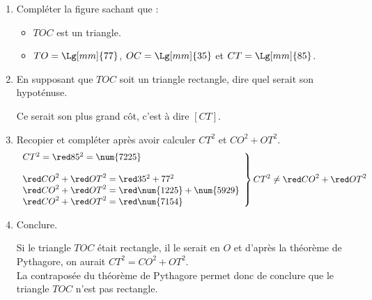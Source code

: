 \begin{corrige}
    \begin{enumerate}
        \item Compléter la figure sachant que :
        \begin{itemize}
            \item $TOC$ est un triangle.
            \item $TO=\Lg[mm]{77}$, $OC=\Lg[mm]{35}$ et $CT=\Lg[mm]{85}$.
        \end{itemize}

        \medskip
        \item En supposant que $TOC$ soit un triangle rectangle, dire quel serait son hypoténuse.
        
        {\red Ce serait son plus grand côt, c'est à dire $[CT]$.}
        \item Recopier et compléter après avoir calculer $CT^2$ et $CO^2+OT^2$.
            $$\left.\begin{array}{l}
            CT^2={\red 85^2 = \num{7225}}\\
            \\
            {\red CO}^2+{\red OT}^2={\red 35^2 + 77^2}\\
            {\red CO}^2+{\red OT}^2={\red \num{1225} + \num{5929}}\\
            {\red CO}^2+{\red OT}^2={\red \num{7154}}\\
            \end{array}
            \right\rbrace CT^2\neq {\red CO}^2+{\red OT}^2$$
        \item Conclure.
        
        {\red Si le triangle $TOC$ était rectangle, il le serait en $O$ et d'après la théorème de Pythagore, on aurait $CT^2=CO^2+OT^2$.\\
        La contraposée du théorème de Pythagore permet donc de conclure que le triangle $TOC$ n'est pas rectangle.}
    \end{enumerate}
\end{corrige}
    
    
